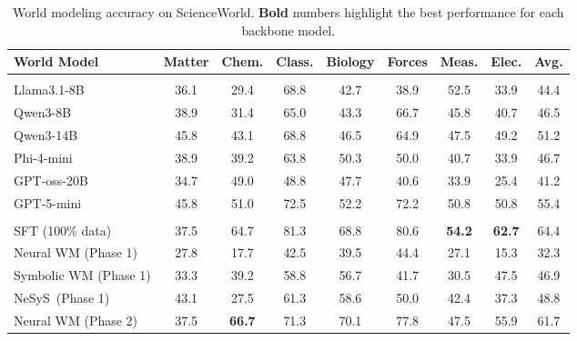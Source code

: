 \documentclass{article}
\theoremstyle{plain}
\theoremstyle{definition}
\theoremstyle{remark}
\newcommand{\ours}{{\sc NeSyS}\xspace}
\begin{document}
\begin{table}[ht]
  \caption{World modeling accuracy on ScienceWorld. \textbf{Bold} numbers highlight the best performance for each backbone model. }
  \label{tab:wm_science_world}
  \centering
  \begin{tabular}{lcccccccc}
    \toprule
    \cmidrule(r){1-2}
    World Model     & Matter & Chem. & Class. & Biology & Forces & Meas. & Elec. & Avg.\\
    \midrule
    \rowcolor{gray!15}
    \multicolumn{9}{c}{\bf Baseline Models} \\
    \midrule
    Llama3.1-8B & 36.1 & 29.4 & 68.8 & 42.7 & 38.9 & 52.5 & 33.9 & 44.4 \\
    Qwen3-8B & 38.9 & 31.4 & 65.0 & 43.3 & 66.7 & 45.8 & 40.7 & 46.5 \\
    Qwen3-14B & 45.8 & 43.1 & 68.8 & 46.5 & 64.9 & 47.5 & 49.2 & 51.2 \\
    Phi-4-mini & 38.9 & 39.2 & 63.8 & 50.3 & 50.0 & 40.7 & 33.9 & 46.7 \\
    GPT-oss-20B &34.7& 49.0& 48.8& 47.7& 40.6& 33.9& 25.4& 41.2\\
    GPT-5-mini & 45.8 & 51.0 & 72.5 & 52.2 & 72.2 & 50.8 & 50.8 & 55.4\\
    \midrule
    \rowcolor{gray!15}
    \multicolumn{9}{c}{\bf Llama3.2-1B} \\
    \midrule
    SFT (100\% data)& 37.5 & 64.7& 81.3& 68.8& 80.6 & \textbf{54.2} & \textbf{62.7} & 64.4\\
    \midrule
    Neural WM (Phase 1) & 27.8 & 17.7 & 42.5 & 39.5 & 44.4 & 27.1 & 15.3 & 32.3\\
    Symbolic WM (Phase 1) & 33.3 & 39.2 & 58.8 & 56.7 & 41.7 & 30.5 & 47.5 & 46.9\\
    \ours\ (Phase 1) & 43.1 & 27.5 & 61.3 & 58.6 & 50.0 & 42.4 & 37.3 & 48.8\\
    \midrule
    Neural WM (Phase 2) & 37.5 & \textbf{66.7} & 71.3 & 70.1 & 77.8 & 47.5 & 55.9 & 61.7\\

\end{tabular}
\end{table}
\end{document}
